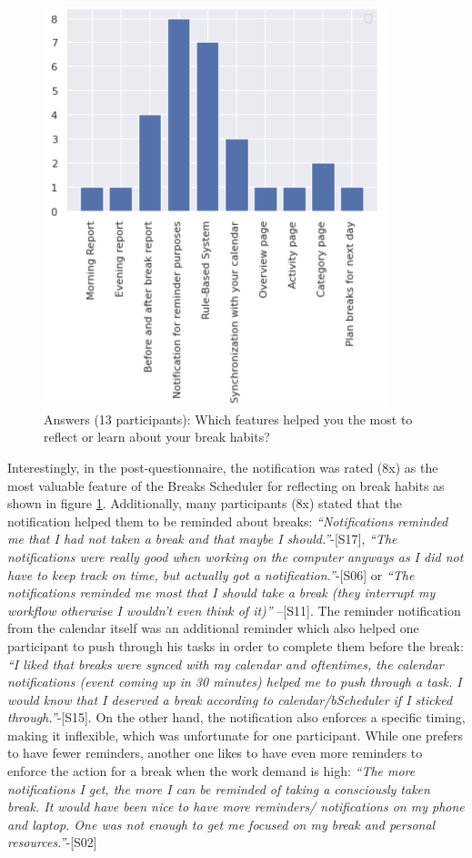 \documentclass{hasel_thesis}
\begin{document}
\begin{figure}[htp]
    \centering
    \includegraphics[width=10cm]{hasel_thesis/images/feature_rating.png}
    \caption{Answers (13 participants): Which features helped you the most to reflect or learn about your break habits?}
    \label{fig:feature_ratings}
\end{figure}

Interestingly, in the post-questionnaire, the notification was rated (8x) as the most valuable feature of the Breaks Scheduler for reflecting on break habits as shown in figure \ref{fig:feature_ratings}. Additionally, many participants (8x) stated that the notification helped them to be reminded about breaks: \textit{“Notifications reminded me that I had not taken a break and that maybe I should.”}-[S17], \textit{“The notifications were really good when working on the computer anyways as I did not have to keep track on time, but actually got a notification.”}-[S06] or \textit{“The notifications reminded me most that I should take a break (they interrupt my workflow otherwise I wouldn't even think of it)”} –[S11]. The reminder notification from the calendar itself was an additional reminder which also helped one participant to push through his tasks in order to complete them before the break: \textit{“I liked that breaks were synced with my calendar and oftentimes, the calendar notifications (event coming up in 30 minutes) helped me to push through a task. I would know that I deserved a break according to calendar/bScheduler if I sticked through.”}-[S15]. On the other hand, the notification also enforces a specific timing, making it inflexible, which was unfortunate for one participant. While one prefers to have fewer reminders, another one likes to have even more reminders to enforce the action for a break when the work demand is high: \textit{“The more notifications I get, the more I can be reminded of taking a consciously taken break. It would have been nice to have more reminders/ notifications on my phone and laptop. One was not enough to get me focused on my break and personal resources.”}-[S02]
\end{document}
